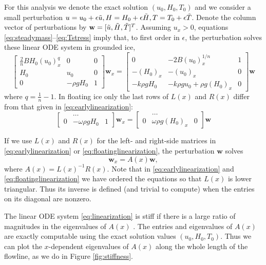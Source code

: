 \documentclass[review,letterpaper]{igs}
\newcommand{\bw}{\mathbf{w}}
\newcommand{\eps}{\epsilon}
\begin{document}
For this analysis we denote the exact solution $(u_0,H_0,T_0)$ and we consider a small perturbation $u = u_0 + \eps \tu, H = H_0 + \eps \tH, T = T_0 + \eps \tT$.  Denote the column vector of perturbations by $\bw = [\tu, \tH, \tT]^T$.  Assuming $u_x > 0$, equations \eqref{eq:steadymass}--\eqref{eq:Tstress} imply that, to first order in $\eps$, the perturbation solves these linear ODE system in grounded ice,
\begin{equation}
\begin{bmatrix}
\frac{2}{n} B H_0 (u_0)_x^q & 0 & 0 \\
H_0 & u_0 & 0 \\
0 & -\rho g H_0 & 1
\end{bmatrix}
\bw_x
=
\begin{bmatrix}
0 & - 2 B (u_0)_x^{1/n} & 1 \\
- (H_0)_x & - (u_0)_x & 0 \\
-k \rho g H_0 & - k \rho g u_0 + \rho g (H_0)_x & 0
\end{bmatrix}
\bw
\label{eq:earlylinearization}
\end{equation}
where $q = \frac{1}{n} - 1$.  In floating ice only the last rows of $L(x)$ and $R(x)$ differ from that given in \eqref{eq:earlylinearization}:
\begin{equation}
\begin{bmatrix}
 & \dots & \\
0 & - \omega \rho g H_0 & 1
\end{bmatrix}
\bw_x
=
\begin{bmatrix}
 & \dots & \\
0 & \omega \rho g (H_0)_x & 0
\end{bmatrix}
\bw
\label{eq:floatinglinearization}
\end{equation}

If we use $L(x)$ and $R(x)$ for the left- and right-side matrices in \eqref{eq:earlylinearization} or \eqref{eq:floatinglinearization}, the perturbation $\bw$ solves
\begin{equation}
\bw_x = A(x) \bw, \label{eq:linearization}
\end{equation}
where $A(x) = L(x)^{-1} R(x)$.  Note that in \eqref{eq:earlylinearization} and \eqref{eq:floatinglinearization} we have ordered the equations so that $L(x)$ is lower triangular.  Thus its inverse is defined (and trivial to compute) when the entries on its diagonal are nonzero.

The linear ODE system \eqref{eq:linearization} is stiff if there is a large ratio of magnitudes in the eigenvalues of $A(x)$ \citep{Pressetal}.  The entries and eigenvalues of $A(x)$ are exactly computable using the exact solution values $(u_0,H_0,T_0)$.  Thus we can plot the $x$-dependent eigenvalues of $A(x)$ along the whole length of the flowline, as we do in Figure \ref{fig:stiffness}.
\end{document}
